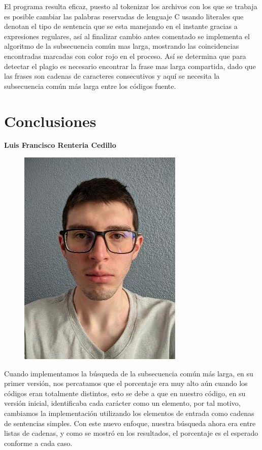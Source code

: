 \documentclass[12pt,twoside]{article}
\begin{document}
    El programa resulta eficaz, puesto al tokenizar los archivos con los que se trabaja es posible cambiar las palabras reservadas de lenguaje C usando literales que denotan el tipo de sentencia que se esta manejando en el instante gracias a expresiones regulares, as\'i al finalizar cambio antes comentado se implementa el algoritmo de la subsecuencia com\'un mas larga, mostrando las coincidencias encontradas marcadas con color rojo en el proceso. As\'i se determina que para detectar el plagio es necesario encontrar la frase mas larga compartida, dado que las frases son cadenas de caracteres consecutivos y aquí se necesita la subsecuencia común más larga entre los c\'odigos fuente.
\newpage
\section{Conclusiones}

    \textbf{\large Luis Francisco Renteria Cedillo}
        \begin{figure}[H]
            \centering
            \includegraphics[angle=0, scale=0.5]{imagenes/foto1.png}
        \end{figure}
    Cuando implementamos la búsqueda de la subsecuencia común más larga, en su primer versión, nos percatamos que el porcentaje era muy alto aún cuando los códigos eran totalmente distintos, esto se debe a que en nuestro código, en su versión inicial, identificaba cada carácter como un elemento, por tal motivo, cambiamos la implementación utilizando los elementos de entrada como cadenas de sentencias simples. Con este nuevo enfoque, nuestra búsqueda ahora era entre listas de cadenas, y como se mostró en los resultados, el porcentaje es el esperado conforme a cada caso.
    
\end{document}
